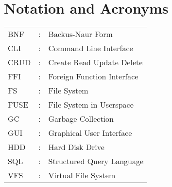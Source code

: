 \chapter*{Notation and Acronyms}
\vspace{1cm}

\noindent
\begin{tabular}{lcl}
    BNF &: & Backus-Naur Form \\
    CLI &: & Command Line Interface \\
    CRUD &: & Create Read Update Delete \\
    FFI &: & Foreign Function Interface \\
    FS &: & File System \\
    FUSE &: & File System in Userspace \\
    GC &: & Garbage Collection \\
    GUI &: & Graphical User Interface \\
    HDD &: & Hard Disk Drive \\
    SQL &: & Structured Query Language \\
    VFS &: & Virtual File System \\
\end{tabular}
